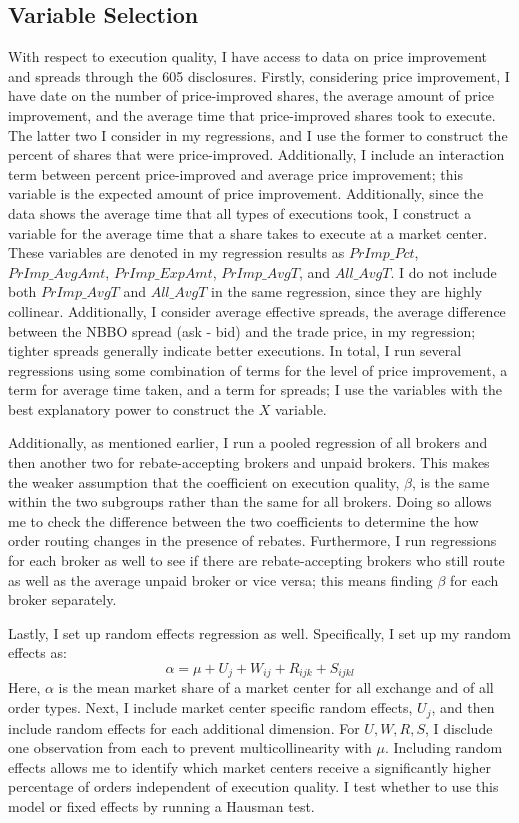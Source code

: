 \documentclass[12pt,a4paper]{article}
\begin{document}
		
	
	\subsection{Variable Selection}
		
		With respect to execution quality, I have access to data on price improvement and spreads through the 605 disclosures. Firstly, considering price improvement, I have date on the number of price-improved shares, the average amount of price improvement, and the average time that price-improved shares took to execute. The latter two I consider in my regressions, and I use the former to construct the percent of shares that were price-improved. Additionally, I include an interaction term between percent price-improved and average price improvement; this variable is the expected amount of price improvement. Additionally, since the data shows the average time that all types of executions took, I construct a variable for the average time that a share takes to execute at a market center. These variables are denoted in my regression results as $PrImp\_Pct$, $PrImp\_AvgAmt$, $PrImp\_ExpAmt$, $PrImp\_AvgT$, and $All\_AvgT$. I do not include both $PrImp\_AvgT$ and $All\_AvgT$ in the same regression, since they are highly collinear. Additionally, I consider average effective spreads, the average difference between the NBBO spread (ask - bid) and the trade price, in my regression; tighter spreads generally indicate better executions. In total, I run several regressions using some combination of terms for the level of price improvement, a term for average time taken, and a term for spreads; I use the variables with the best explanatory power to construct the $X$ variable. 
		
		Additionally, as mentioned earlier, I run a pooled regression of all brokers and then another two for rebate-accepting brokers and unpaid brokers. This makes the weaker assumption that the coefficient on execution quality, $\beta$, is the same within the two subgroups rather than the same for all brokers. Doing so allows me to check the difference between the two coefficients to determine the how order routing changes in the presence of rebates. Furthermore, I run regressions for each broker as well to see if there are rebate-accepting brokers who still route as well as the average unpaid broker or vice versa; this means finding $\beta$ for each broker separately. 
		
		Lastly, I set up random effects regression as well. Specifically, I set up my random effects as:
		$$\alpha = \mu + U_j + W_{ij} + R_{ijk} + S_{ijkl} $$
		Here, $\alpha$ is the mean market share of a market center for all exchange and of all order types. Next, I include market center specific random effects, $U_j$, and then include random effects for each additional dimension. For $U, W, R, S$, I disclude one observation from each to prevent multicollinearity with $\mu$. Including random effects allows me to identify which market centers receive a significantly higher percentage of orders independent of execution quality. I test whether to use this model or fixed effects by running a Hausman test. 
	
\end{document}

